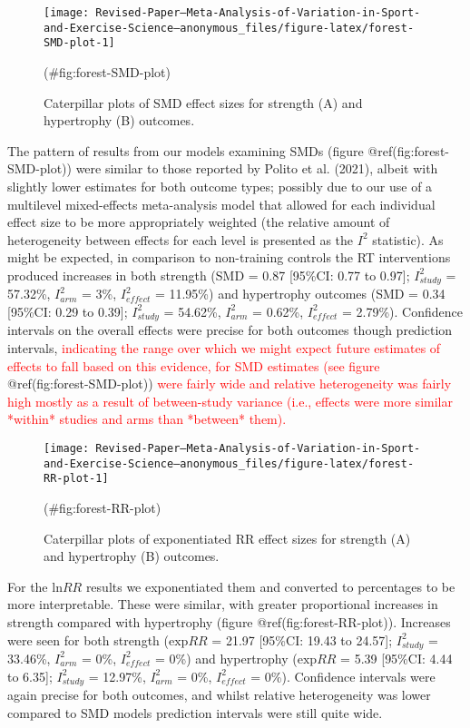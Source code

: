 \documentclass[
]{article}
\begin{document}
\begin{figure}

{\centering \texttt{[image: Revised-Paper---Meta-Analysis-of-Variation-in-Sport-and-Exercise-Science---anonymous\_files/figure-latex/forest-SMD-plot-1]} 

}

\caption{Caterpillar plots of SMD effect sizes for strength (A) and hypertrophy (B) outcomes.}(\#fig:forest-SMD-plot)
\end{figure}

The pattern of results from our models examining SMDs (figure @ref(fig:forest-SMD-plot)) were similar to those reported by Polito et al. (2021), albeit with slightly lower estimates for both outcome types; possibly due to our use of a multilevel mixed-effects meta-analysis model that allowed for each individual effect size to be more appropriately weighted (the relative amount of heterogeneity between effects for each level is presented as the \(I^2\) statistic). As might be expected, in comparison to non-training controls the RT interventions produced increases in both strength (SMD = 0.87 {[}95\%CI: 0.77 to 0.97{]}; \(I^2_{study}\) = 57.32\%, \(I^2_{arm}\) = 3\%, \(I^2_{effect}\) = 11.95\%) and hypertrophy outcomes (SMD = 0.34 {[}95\%CI: 0.29 to 0.39{]}; \(I^2_{study}\) = 54.62\%, \(I^2_{arm}\) = 0.62\%, \(I^2_{effect}\) = 2.79\%). Confidence intervals on the overall effects were precise for both outcomes though prediction intervals, \textcolor{red}{indicating the range over which we might expect future estimates of effects to fall based on this evidence, for SMD estimates (see figure }@ref(fig:forest-SMD-plot)) \textcolor{red}{were fairly wide and relative heterogeneity was fairly high mostly as a result of between-study variance (i.e., effects were more similar *within* studies and arms than *between* them).}

\begin{figure}

{\centering \texttt{[image: Revised-Paper---Meta-Analysis-of-Variation-in-Sport-and-Exercise-Science---anonymous\_files/figure-latex/forest-RR-plot-1]} 

}

\caption{Caterpillar plots of exponentiated RR effect sizes for strength (A) and hypertrophy (B) outcomes.}(\#fig:forest-RR-plot)
\end{figure}

For the \(\textrm{ln}RR\) results we exponentiated them and converted to percentages to be more interpretable. These were similar, with greater proportional increases in strength compared with hypertrophy (figure @ref(fig:forest-RR-plot)). Increases were seen for both strength (\(\textrm{exp}RR\) = 21.97 {[}95\%CI: 19.43 to 24.57{]}; \(I^2_{study}\) = 33.46\%, \(I^2_{arm}\) = 0\%, \(I^2_{effect}\) = 0\%) and hypertrophy (\(\textrm{exp}RR\) = 5.39 {[}95\%CI: 4.44 to 6.35{]}; \(I^2_{study}\) = 12.97\%, \(I^2_{arm}\) = 0\%, \(I^2_{effect}\) = 0\%). Confidence intervals were again precise for both outcomes, and whilst relative heterogeneity was lower compared to SMD models prediction intervals were still quite wide.
\end{document}
